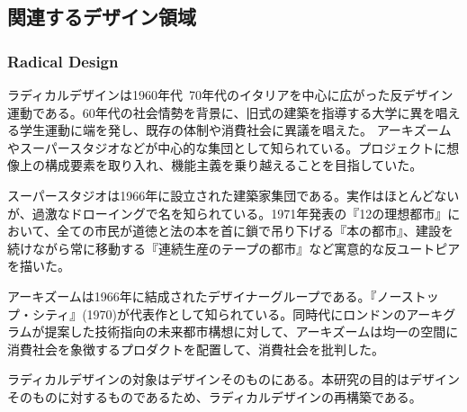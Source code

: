 \documentclass{jsarticle}
\begin{document}
\subsection{関連するデザイン領域}

\subsubsection{Radical Design}
ラディカルデザインは1960年代~70年代のイタリアを中心に広がった反デザイン運動である。60年代の社会情勢を背景に、旧式の建築を指導する大学に異を唱える学生運動に端を発し、既存の体制や消費社会に異議を唱えた。
アーキズームやスーパースタジオなどが中心的な集団として知られている。プロジェクトに想像上の構成要素を取り入れ、機能主義を乗り越えることを目指していた。

スーパースタジオは1966年に設立された建築家集団である。実作はほとんどないが、過激なドローイングで名を知られている。1971年発表の『12の理想都市』において、全ての市民が道徳と法の本を首に鎖で吊り下げる『本の都市』、建設を続けながら常に移動する『連続生産のテープの都市』など寓意的な反ユートピアを描いた。

アーキズームは1966年に結成されたデザイナーグループである。『ノーストップ・シティ』(1970)が代表作として知られている。同時代にロンドンのアーキグラムが提案した技術指向の未来都市構想に対して、アーキズームは均一の空間に消費社会を象徴するプロダクトを配置して、消費社会を批判した。

ラディカルデザインの対象はデザインそのものにある。本研究の目的はデザインそのものに対するものであるため、ラディカルデザインの再構築である。
\end{document}
